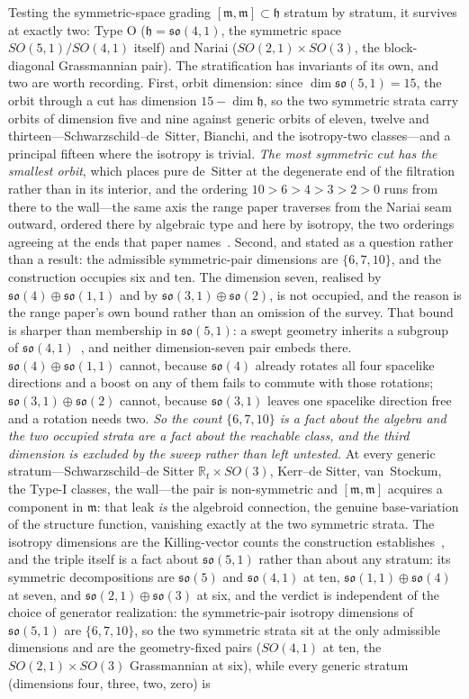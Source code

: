 \documentclass[11pt,a4paper]{article}
\theoremstyle{plain}
\theoremstyle{definition}
\theoremstyle{remark}
\newcommand{\so}{\mathfrak{so}}
\newcommand{\fh}{\mathfrak{h}}
\newcommand{\fm}{\mathfrak{m}}
\begin{document}
Testing the symmetric-space grading $[\fm,\fm]\subset\fh$ stratum by stratum, it survives at exactly two: Type O ($\fh=\so(4,1)$, the symmetric space $SO(5,1)/SO(4,1)$ itself) and Nariai ($SO(2,1)\times SO(3)$, the block-diagonal Grassmannian pair). The stratification has invariants of its own, and two are worth recording. First, orbit dimension: since $\dim\so(5,1)=15$, the orbit through a cut has dimension $15-\dim\fh$, so the two symmetric strata carry orbits of dimension five and nine against generic orbits of eleven, twelve and thirteen---Schwarzschild--de~Sitter, Bianchi, and the isotropy-two classes---and a principal fifteen where the isotropy is trivial. \emph{The most symmetric cut has the smallest orbit}, which places pure de~Sitter at the degenerate end of the filtration rather than in its interior, and the ordering $10>6>4>3>2>0$ runs from there to the wall---the same axis the range paper traverses from the Nariai seam outward, ordered there by algebraic type and here by isotropy, the two orderings agreeing at the ends that paper names~\cite{JanzenRange}. Second, and stated as a question rather than a result: the admissible symmetric-pair dimensions are $\{6,7,10\}$, and the construction occupies six and ten. The dimension seven, realised by $\so(4)\oplus\so(1,1)$ and by $\so(3,1)\oplus\so(2)$, is not occupied, and the reason is the range paper's own bound rather than an omission of the survey. That bound is sharper than membership in $\so(5,1)$: a swept geometry inherits a subgroup of $\so(4,1)$~\cite{JanzenRange}, and neither dimension-seven pair embeds there. $\so(4)\oplus\so(1,1)$ cannot, because $\so(4)$ already rotates all four spacelike directions and a boost on any of them fails to commute with those rotations; $\so(3,1)\oplus\so(2)$ cannot, because $\so(3,1)$ leaves one spacelike direction free and a rotation needs two. \emph{So the count $\{6,7,10\}$ is a fact about the algebra and the two occupied strata are a fact about the reachable class, and the third dimension is excluded by the sweep rather than left untested.} At every generic stratum---Schwarzschild--de Sitter $\mathbb{R}_t\times SO(3)$, Kerr--de Sitter, van~Stockum, the Type-I classes, the wall---the pair is non-symmetric and $[\fm,\fm]$ acquires a component in $\fm$: that leak \emph{is} the algebroid connection, the genuine base-variation of the structure function, vanishing exactly at the two symmetric strata. The isotropy dimensions are the Killing-vector counts the construction establishes~\cite{JanzenRange}, and the triple itself is a fact about $\so(5,1)$ rather than about any stratum: its symmetric decompositions are $\so(5)$ and $\so(4,1)$ at ten, $\so(1,1)\oplus\so(4)$ at seven, and $\so(2,1)\oplus\so(3)$ at six, and the verdict is independent of the choice of generator realization: the symmetric-pair isotropy dimensions of $\so(5,1)$ are $\{6,7,10\}$, so the two symmetric strata sit at the only admissible dimensions and are the geometry-fixed pairs ($SO(4,1)$ at ten, the $SO(2,1)\times SO(3)$ Grassmannian at six), while every generic stratum (dimensions four, three, two, zero) is 
\end{document}
